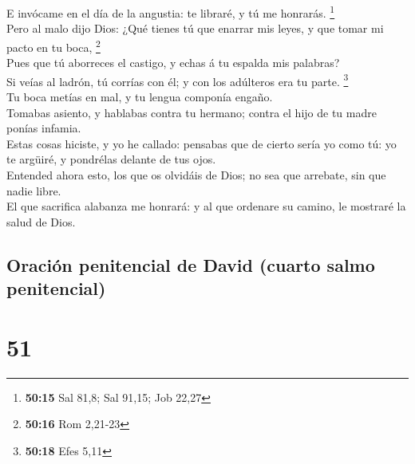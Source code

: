  E invócame en el día de la angustia: te libraré, y tú me
honrarás. \footnote{\textbf{50:15} Sal 81,8; Sal 91,15; Job 22,27}\\
 Pero al malo dijo Dios: ¿Qué tienes tú que enarrar mis
leyes, y que tomar mi pacto en tu boca, \footnote{\textbf{50:16} Rom
  2,21-23}\\
 Pues que tú aborreces el castigo, y echas á tu espalda mis
palabras?\\
 Si veías al ladrón, tú corrías con él; y con los adúlteros
era tu parte. \footnote{\textbf{50:18} Efes 5,11}\\
 Tu boca metías en mal, y tu lengua componía engaño.\\
 Tomabas asiento, y hablabas contra tu hermano; contra el
hijo de tu madre ponías infamia.\\
 Estas cosas hiciste, y yo he callado: pensabas que de
cierto sería yo como tú: yo te argüiré, y pondrélas delante de tus
ojos.\\
 Entended ahora esto, los que os olvidáis de Dios; no sea
que arrebate, sin que nadie libre.\\
 El que sacrifica alabanza me honrará: y al que ordenare su
camino, le mostraré la salud de Dios.

\hypertarget{oraciuxf3n-penitencial-de-david-cuarto-salmo-penitencial}{%
\subsection{Oración penitencial de David (cuarto salmo
penitencial)}\label{oraciuxf3n-penitencial-de-david-cuarto-salmo-penitencial}}

\hypertarget{section-50}{%
\section{51}\label{section-50}}


